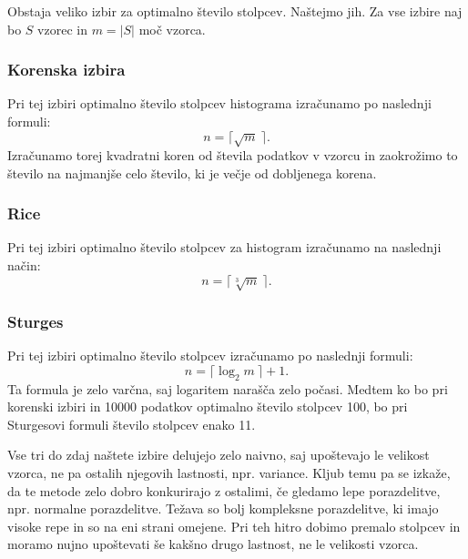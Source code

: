 Obstaja veliko izbir za optimalno število stolpcev. Naštejmo jih. Za vse izbire naj bo $S$ vzorec in $m = |S|$ moč vzorca.

\pagebreak

\subsubsection{Korenska izbira}
Pri tej izbiri optimalno število stolpcev histograma izračunamo po naslednji formuli:
\begin{equation}
    n = \big\lceil \sqrt{m}\  \big\rceil.
\end{equation}
Izračunamo torej kvadratni koren od števila podatkov v vzorcu in zaokrožimo to število na najmanjše celo število, ki je večje od dobljenega korena.

\subsubsection{Rice}
Pri tej izbiri optimalno število stolpcev za histogram izračunamo na naslednji način:
\begin{equation}
    n = \big\lceil \sqrt[3]{m}\  \big\rceil.
\end{equation}

\subsubsection{Sturges}
Pri tej izbiri optimalno število stolpcev izračunamo po naslednji formuli:
\begin{equation}
    n = \big\lceil \log_2{m}\  \big\rceil + 1.
\end{equation}
Ta formula je zelo varčna, saj logaritem narašča zelo počasi. Medtem ko bo pri korenski izbiri in 10000 podatkov optimalno število stolpcev 100, bo pri Sturgesovi formuli število stolpcev enako 11.

Vse tri do zdaj naštete izbire delujejo zelo naivno, saj upoštevajo le velikost vzorca, ne pa ostalih njegovih lastnosti, npr. variance. Kljub temu pa se izkaže, da te metode zelo dobro konkurirajo z ostalimi, če gledamo lepe porazdelitve, npr. normalne porazdelitve. Težava so bolj kompleksne porazdelitve, ki imajo visoke repe in so na eni strani omejene. Pri teh hitro dobimo premalo stolpcev in moramo nujno upoštevati še kakšno drugo lastnost, ne le velikosti vzorca.


